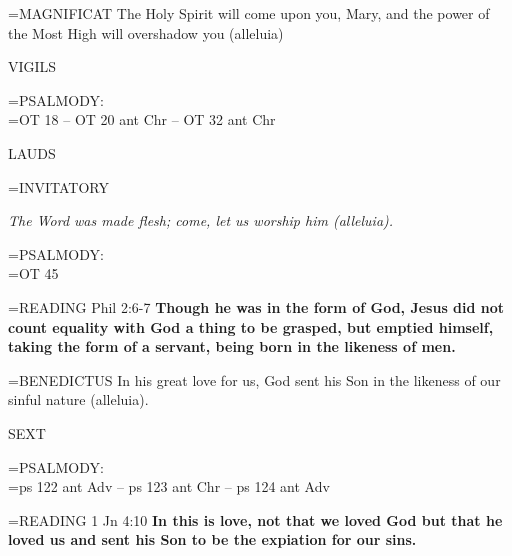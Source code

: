 \hangindent=\parindent \small{MAGNIFICAT  The Holy Spirit will come upon you, Mary, and the
power of the Most High will overshadow you (alleluia)\\}
 
\begin{flushleft}\normalsize VIGILS\\\end{flushleft}

\hangindent=\parindent \small{PSALMODY:}\\
\hangindent=\parindent  OT 18 -- OT 20 ant Chr -- OT 32 ant Chr\vspace{0.5em}

\begin{flushleft}\normalsize LAUDS\\\end{flushleft}

\hangindent=\parindent \small{INVITATORY}
\begin{center}
\textit{The Word was made flesh; come, let us worship him (alleluia).\\}
\end{center}

\hangindent=\parindent \small{PSALMODY:}\\
\hangindent=\parindent  OT 45\vspace{0.5em}

\hangindent=\parindent \small{READING} Phil 2:6-7 \textbf{Though he was in the form of God, Jesus did
not count equality with God a thing to be grasped, but emptied
himself, taking the form of a servant, being born in the likeness of
men.\\}
 
\hangindent=\parindent \small{BENEDICTUS  In his great love for us, God sent his Son in the likeness
of our sinful nature (alleluia).\\}
 
\begin{flushleft}\normalsize SEXT\\\end{flushleft}

\hangindent=\parindent \small{PSALMODY:}\\
\hangindent=\parindent  ps 122 ant Adv -- ps 123 ant Chr -- ps 124 ant Adv\vspace{0.5em}

\hangindent=\parindent \small{READING} 1 Jn 4:10 \textbf{In this is love, not that we loved God but that he
loved us and sent his Son to be the expiation for our sins.}
 
